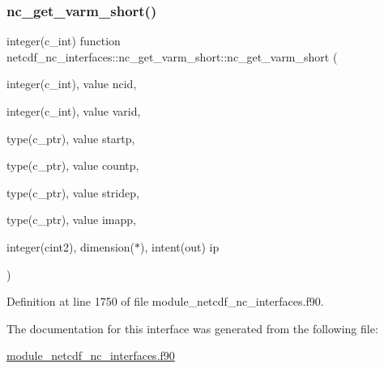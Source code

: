 \subsubsection{\texorpdfstring{nc\+\_\+get\+\_\+varm\+\_\+short()}{nc\_get\_varm\_short()}}
{\footnotesize\ttfamily integer(c\+\_\+int) function netcdf\+\_\+nc\+\_\+interfaces\+::nc\+\_\+get\+\_\+varm\+\_\+short\+::nc\+\_\+get\+\_\+varm\+\_\+short (\begin{DoxyParamCaption}\item[{integer(c\+\_\+int), value}]{ncid,  }\item[{integer(c\+\_\+int), value}]{varid,  }\item[{type(c\+\_\+ptr), value}]{startp,  }\item[{type(c\+\_\+ptr), value}]{countp,  }\item[{type(c\+\_\+ptr), value}]{stridep,  }\item[{type(c\+\_\+ptr), value}]{imapp,  }\item[{integer(cint2), dimension($\ast$), intent(out)}]{ip }\end{DoxyParamCaption})}



Definition at line 1750 of file module\+\_\+netcdf\+\_\+nc\+\_\+interfaces.\+f90.



The documentation for this interface was generated from the following file\+:\begin{DoxyCompactItemize}
\item 
\hyperlink{module__netcdf__nc__interfaces_8f90}{module\+\_\+netcdf\+\_\+nc\+\_\+interfaces.\+f90}\end{DoxyCompactItemize}
